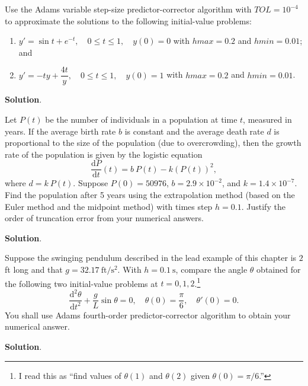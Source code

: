 \documentclass[11pt]{article}
\theoremstyle{break}
\newcommand{\dd}{\text{d}}
\numberwithin{equation}{theorem}
\begin{document}
\newpage
\begin{problem}\label{problem 13} %
    Use the Adams variable step-size predictor-corrector algorithm with $TOL = 10^{-4}$ to approximate the solutions to the following initial-value problems:
    \begin{enumerate}
        \item $y'=\sin t+e^{-t}, \quad 0\leq t\leq 1, \quad y(0)=0$ with $hmax=0.2$ and $hmin=0.01$; and
        \item $y'=-ty+\dfrac{4t}{y}, \quad 0\leq t\leq 1, \quad y(0)=1$ with $hmax=0.2$ and $hmin=0.01$.
    \end{enumerate}
\end{problem}
\textbf{Solution}. 


\newpage
\begin{problem}\label{problem 14} %
    Let $P(t)$ be the number of individuals in a population at time $t$, measured in years. If the average birth rate $b$ is constant and the average death rate $d$ is proportional to the size of the population (due to overcrowding), then the growth rate of the population is given by the logistic equation $$\dfrac{\dd P}{\dd t}(t)=b\:P(t)-k(P(t))^2,$$ where $d=k\:P(t)$. Suppose $P(0)=50976$, $b=2.9\times10^{-2}$, and $k=1.4\times 10^{-7}$. Find the population after 5 years using the extrapolation method (based on the Euler method and the midpoint method) with times step $h=0.1$. Justify the order of truncation error from your numerical answers.
\end{problem}
\textbf{Solution}. 


\newpage
\begin{problem}\label{problem 15} %
    Suppose the swinging pendulum described in the lead example of this chapter is $2$ ft long and that $g = 32.17\ \text{ft}/\text{s}^2$. With $h = 0.1\ \text{s}$, compare the angle $\theta$ obtained for the following two initial-value problems at $t = 0, 1, 2$.\footnote{I read this as ``find values of $\theta(1)$ and $\theta(2)$ given $\theta(0)=\pi/6$.''} $$\dfrac{\dd^2\theta}{\dd t^2}+\dfrac{g}{L}\sin\theta=0, \quad \theta(0)=\dfrac{\pi}{6},\quad \theta'(0)=0.$$ You shall use Adams fourth-order predictor-corrector algorithm to obtain your numerical answer.
\end{problem}
\textbf{Solution}. 
\end{document}
